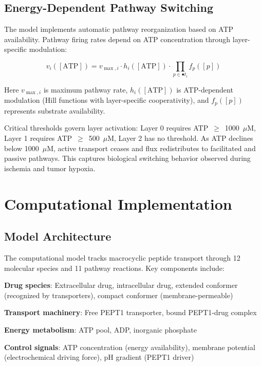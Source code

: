 \documentclass[10pt,letterpaper]{article}
\begin{document}
\subsection{Energy-Dependent Pathway Switching}

The model implements automatic pathway reorganization based on ATP availability. Pathway firing rates depend on ATP concentration through layer-specific modulation:

\begin{equation}
\label{eq:hierarchical_firing}
v_i([\text{ATP}]) = v_{\max,i} \cdot h_i([\text{ATP}]) \cdot \prod_{p \in \bullet t_i} f_p([p])
\end{equation}

Here $v_{\max,i}$ is maximum pathway rate, $h_i([\text{ATP}])$ is ATP-dependent modulation (Hill functions with layer-specific cooperativity), and $f_p([p])$ represents substrate availability.

Critical thresholds govern layer activation: Layer 0 requires ATP~$\geq$~1000~$\mu$M, Layer 1 requires ATP~$\geq$~500~$\mu$M, Layer 2 has no threshold. As ATP declines below 1000~$\mu$M, active transport ceases and flux redistributes to facilitated and passive pathways. This captures biological switching behavior observed during ischemia and tumor hypoxia.

\section{Computational Implementation}
\label{sec:model}

\subsection{Model Architecture}

The computational model tracks macrocyclic peptide transport through 12 molecular species and 11 pathway reactions. Key components include:

\textbf{Drug species}: Extracellular drug, intracellular drug, extended conformer (recognized by transporters), compact conformer (membrane-permeable)

\textbf{Transport machinery}: Free PEPT1 transporter, bound PEPT1-drug complex

\textbf{Energy metabolism}: ATP pool, ADP, inorganic phosphate

\textbf{Control signals}: ATP concentration (energy availability), membrane potential (electrochemical driving force), pH gradient (PEPT1 driver)
\end{document}
